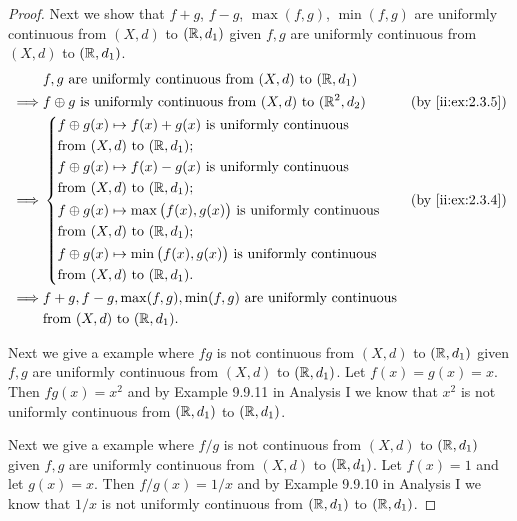 \begin{proof}
  Next we show that \(f + g\), \(f - g\), \(\max(f, g)\), \(\min(f, g)\) are uniformly continuous from \((X, d)\) to \((\mathbb{R}, d_1)\) given \(f, g\) are uniformly continuous from \((X, d)\) to \((\mathbb{R}, d_1)\).
  \begin{align*}
             & f, g \text{ are uniformly continuous from } (X, d) \text{ to } (\R, d_1)                                \\
    \implies & f \oplus g \text{ is uniformly continuous from } (X, d) \text{ to } (\R^2, d_2)   &  & \by{ii:ex:2.3.5} \\
    \implies & \begin{dcases}
                 f \oplus g(x) \mapsto f(x) + g(x) \text{ is uniformly continuous}              \\
                 \text{from } (X, d) \text{ to } (\R, d_1);                                     \\
                 f \oplus g(x) \mapsto f(x) - g(x) \text{ is uniformly continuous}              \\
                 \text{from } (X, d) \text{ to } (\R, d_1);                                     \\
                 f \oplus g(x) \mapsto \max\big(f(x), g(x)\big) \text{ is uniformly continuous} \\
                 \text{from } (X, d) \text{ to } (\R, d_1);                                     \\
                 f \oplus g(x) \mapsto \min\big(f(x), g(x)\big) \text{ is uniformly continuous} \\
                 \text{from } (X, d) \text{ to } (\R, d_1).
               \end{dcases} &  & \by{ii:ex:2.3.4}                          \\
    \implies & f + g, f - g, \max(f, g), \min(f, g) \text{ are uniformly continuous}                                   \\
             & \text{from } (X, d) \text{ to } (\R, d_1).
  \end{align*}

  Next we give a example where \(fg\) is not continuous from \((X, d)\) to \((\mathbb{R}, d_1)\) given \(f, g\) are uniformly continuous from \((X, d)\) to \((\mathbb{R}, d_1)\).
  Let \(f(x) = g(x) = x\).
  Then \(fg(x) = x^2\) and by Example 9.9.11 in Analysis I we know that \(x^2\) is not uniformly continuous from \((\mathbb{R}, d_1)\) to \((\mathbb{R}, d_1)\).

  Next we give a example where \(f / g\) is not continuous from \((X, d)\) to \((\mathbb{R}, d_1)\) given \(f, g\) are uniformly continuous from \((X, d)\) to \((\mathbb{R}, d_1)\).
  Let \(f(x) = 1\) and let \(g(x) = x\).
  Then \(f / g(x) = 1 / x\) and by Example 9.9.10 in Analysis I we know that \(1 / x\) is not uniformly continuous from \((\mathbb{R}, d_1)\) to \((\mathbb{R}, d_1)\).


\end{proof}
